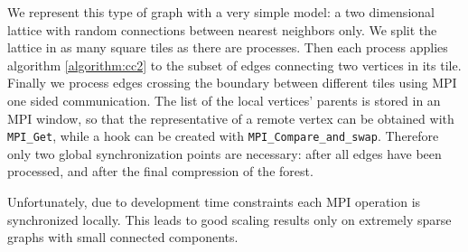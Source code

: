 We represent this type of graph with a very simple model: a two dimensional lattice with random
connections between nearest neighbors
only. We split the lattice in as many square tiles as there are processes. Then each process
applies algorithm \ref{algorithm:cc2} to the subset
of edges connecting two vertices in its tile. Finally we process
edges crossing the boundary between different tiles using MPI one sided communication. The list
of the local vertices' parents is stored in an MPI window, so that
the representative of a remote vertex
can be obtained with \verb|MPI_Get|, while a hook can be created with \verb|MPI_Compare_and_swap|.
Therefore only two global synchronization points are necessary: after all edges have been
processed, and after the final compression
of the forest.

Unfortunately, due to development time constraints each MPI
operation is
synchronized locally.
This leads to good scaling results only on extremely sparse graphs with small connected
components.





